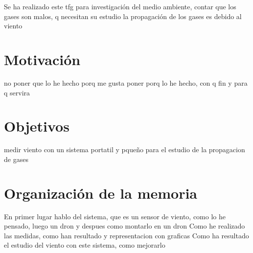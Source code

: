 
Se ha realizado este tfg para investigación del medio ambiente, contar que los gases son malos, q necesitan su estudio
la propagación de los gases es debido al viento
\section{Motivación}
no poner que lo he hecho porq me gusta
poner porq lo he hecho, con q fin y para q servira
\section{Objetivos}
medir viento con un sistema portatil y pqueño para el estudio de la propagacion de gases
\section{Organización de la memoria}
En primer lugar hablo del sistema, que es un sensor de viento, como lo he pensado, luego un dron y despues como montarlo en un dron
Como he realizado las medidas, como han resultado y representacion con graficas
Como ha resultado el estudio del viento con este sistema, como mejorarlo
